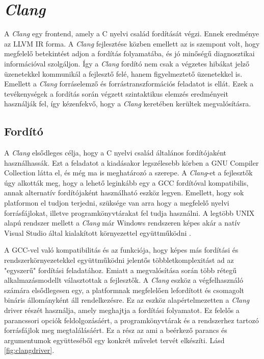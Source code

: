 \documentclass[a4paper,12pt]{report}
\begin{document}
\section{\emph{Clang}}
A \emph{Clang} egy frontend, amely a C nyelvi család fordítását végzi. Ennek eredménye az LLVM IR forma. A \emph{Clang} fejlesztése közben emellett az is szempont volt, hogy megfelelő betekintést adjon a fordítás folyamatába, és jó minőségű diagnosztikai információval szolgáljon. Így a \emph{Clang} fordító nem csak a végzetes hibákat jelző üzenetekkel kommunikál a fejlesztő felé, hanem figyelmeztető üzenetekkel is. Emellett a \emph{Clang} forráselemző és forrástranszformációs feladatot is ellát. Ezek a tevékenységek a fordítás során végzett szintaktikus elemzés eredményeit használják fel, így kézenfekvő, hogy a \emph{Clang} keretében kerültek megvalósításra.

\subsection{Fordító}
A \emph{Clang} elsődleges célja, hogy a C nyelvi család általános fordítójaként használhassák. Ezt a feladatot a kiadásakor legszélesebb körben a GNU Compiler Collection látta el, és még ma is meghatározó a szerepe. A \emph{Clang}-et a fejlesztők úgy alkották meg, hogy a lehető leginkább egy a GCC fordítóval kompatibilis, annak alternatív fordítójaként használható eszköz legyen. Emellett, hogy sok platformon el tudjon terjedni, szüksége van arra hogy a megfelelő nyelvi forrásfájlokat, illetve programkönyvtárakat fel tudja használni. A legtöbb UNIX alapú rendszer mellett a \emph{Clang} már Windows rendszeren képes akár a natív Visual Studio által kialakított környezettel együttműködni \cite{clangusermanual}.

A GCC-vel való kompatibilitás és az funkciója, hogy képes más fordítási és rendszerkörnyezetekkel együttműködni jelentős többletkomplexitást ad az "egyszerű" fordítási feladatához. Emiatt a megvalósítása során több rétegű alkalmazásmodellt választottak a fejlesztők. A \emph{Clang} eszköz a végfelhasználó számára elsődlegesen egy, a platformnak megfelelően lefordított és csomagolt bináris állományként áll rendelkezésre. Ez az eszköz alapértelmezetten a \emph{Clang} driver részét használja, amely meghajtja a fordítási folyamatot. Ez felelős a parancssori opciók feldolgozásáért, a programkönyvtárak és a rendszerhez tartozó forrásfájlok meg megtalálásáért. Ez a rész az ami a beérkező parancs és argumentumok együtteséből egy konkrét művelet tervét elkészíti. Lásd \ref{fig:clangdriver}.
\end{document}

